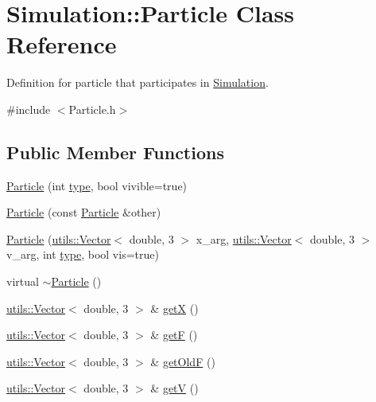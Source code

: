 \hypertarget{classSimulation_1_1Particle}{\section{Simulation\-:\-:Particle Class Reference}
\label{classSimulation_1_1Particle}
}


Definition for particle that participates in \hyperlink{namespaceSimulation}{Simulation}.  




{\ttfamily \#include $<$Particle.\-h$>$}

\subsection*{Public Member Functions}
\begin{DoxyCompactItemize}
\item 
\hyperlink{classSimulation_1_1Particle_ac41912df0ce136018e70f568aef0d6dd}{Particle} (int \hyperlink{classtype}{type}, bool vivible=true)
\item 
\hyperlink{classSimulation_1_1Particle_a24b04cb7c6f7ea4242d25c410f44ae56}{Particle} (const \hyperlink{classSimulation_1_1Particle}{Particle} \&other)
\item 
\hyperlink{classSimulation_1_1Particle_adb4ed8bc5618347a28cbbdaf0047309c}{Particle} (\hyperlink{classutils_1_1Vector}{utils\-::\-Vector}$<$ double, 3 $>$ x\-\_\-arg, \hyperlink{classutils_1_1Vector}{utils\-::\-Vector}$<$ double, 3 $>$ v\-\_\-arg, int \hyperlink{classtype}{type}, bool vis=true)
\item 
virtual \hyperlink{classSimulation_1_1Particle_ad030d0fe7b88cf81744b127c99244ff4}{$\sim$\-Particle} ()
\item 
\hyperlink{classutils_1_1Vector}{utils\-::\-Vector}$<$ double, 3 $>$ \& \hyperlink{classSimulation_1_1Particle_ab7ade5dc156dfa0234aa0323564e46ed}{get\-X} ()
\item 
\hyperlink{classutils_1_1Vector}{utils\-::\-Vector}$<$ double, 3 $>$ \& \hyperlink{classSimulation_1_1Particle_acd84c445e2bd5f5280a00e76cfe73fe0}{get\-F} ()
\item 
\hyperlink{classutils_1_1Vector}{utils\-::\-Vector}$<$ double, 3 $>$ \& \hyperlink{classSimulation_1_1Particle_a1204435fc08c697b0fea230616d1bbdf}{get\-Old\-F} ()
\item 
\hyperlink{classutils_1_1Vector}{utils\-::\-Vector}$<$ double, 3 $>$ \& \hyperlink{classSimulation_1_1Particle_aaf3ecbc6e1e31b259fe239461ba13dbd}{get\-V} ()

\end{DoxyCompactItemize}
